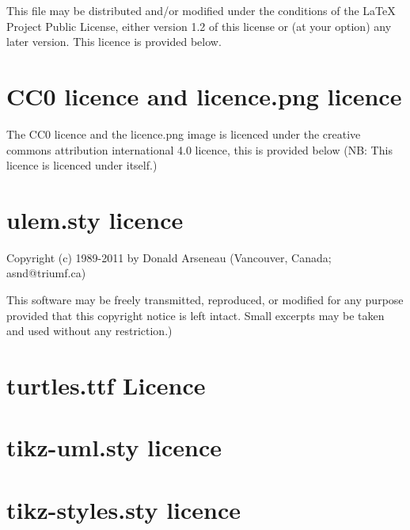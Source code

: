 This file may be distributed and/or modified under the conditions of the LaTeX
Project Public License, either version 1.2 of this license or (at your option)
any later version. This licence is provided below.



\section{CC0 licence and licence.png licence}
The CC0 licence and the licence.png image is licenced under the creative commons
attribution international 4.0 licence, this is provided below (NB: This licence
is licenced under itself.)



\section{ulem.sty licence}
Copyright (c) 1989-2011 by Donald Arseneau (Vancouver, Canada; asnd@triumf.ca)

This software may be freely transmitted, reproduced, or modified for any purpose
provided that this copyright notice is left intact. Small excerpts may be taken
and used without any restriction.)

\section{turtles.ttf Licence}

\section{tikz-uml.sty licence}

\section{tikz-styles.sty licence}
